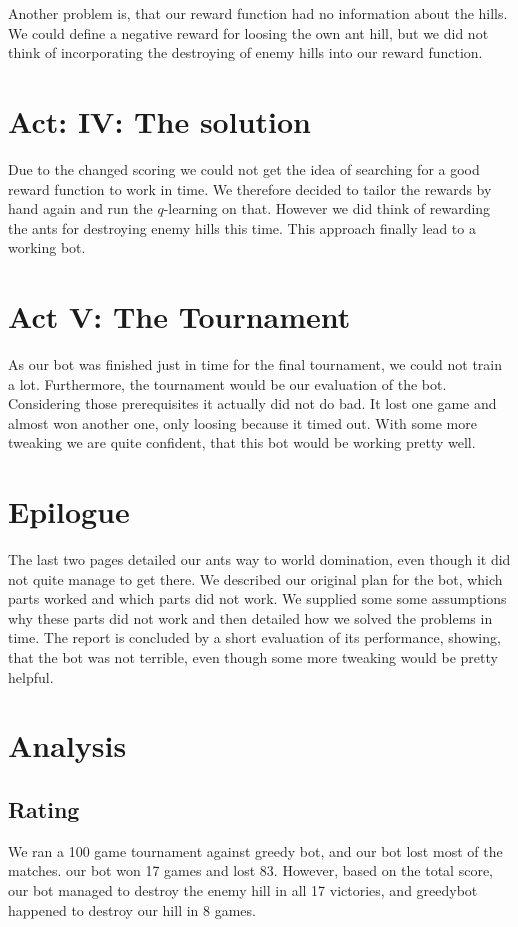 \documentclass{article}
\begin{document}
Another problem is, that our reward function had no information about the hills. We could define a
negative reward for loosing the own ant hill, but we did not think of incorporating the destroying
of enemy hills into our reward function.
\section*{Act: IV: The solution}
Due to the changed scoring we could not get the idea of searching for a good reward function to
work in time. We therefore decided to tailor the rewards by hand again and run the $q$-learning on
that. However we did think of rewarding the ants for destroying enemy hills this time. This approach
finally lead to a working bot.
\section*{Act V: The Tournament}
As our bot was finished just in time for the final tournament, we could not train a lot.
Furthermore, the tournament would be our evaluation of the bot. Considering those prerequisites it
actually did not do bad. It lost one game and almost won another one, only loosing because it timed
out. With some more tweaking we are quite confident, that this bot would be working pretty well.
\section*{Epilogue}
The last two pages detailed our ants way to world domination, even though it did not quite manage to
get there. We described our original plan for the bot, which parts worked and which parts did not
work. We supplied some some assumptions why these parts did not work and then detailed how we solved
the problems in time. The report is concluded by a short evaluation of its performance, showing,
that the bot was not terrible, even though some more tweaking would be pretty helpful.
\section*{Analysis}
\subsection*{Rating}
We ran a 100 game tournament against greedy bot, and our bot lost most of the matches. our bot won 17 games and lost 83. However, based on the total score, our bot managed to destroy the enemy hill in all 17 victories, and greedybot happened to destroy our hill in 8 games.
\end{document}
